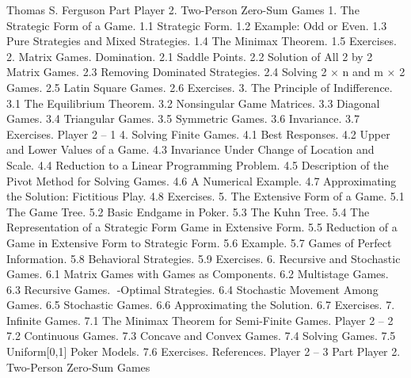 Thomas S. Ferguson
Part Player 2. Two-Person Zero-Sum Games
1. The Strategic Form of a Game.
1.1 Strategic Form.
1.2 Example: Odd or Even.
1.3 Pure Strategies and Mixed Strategies.
1.4 The Minimax Theorem.
1.5 Exercises.
2. Matrix Games. Domination.
2.1 Saddle Points.
2.2 Solution of All 2 by 2 Matrix Games.
2.3 Removing Dominated Strategies.
2.4 Solving 2 × n and m × 2 Games.
2.5 Latin Square Games.
2.6 Exercises.
3. The Principle of Indifference.
3.1 The Equilibrium Theorem.
3.2 Nonsingular Game Matrices.
3.3 Diagonal Games.
3.4 Triangular Games.
3.5 Symmetric Games.
3.6 Invariance.
3.7 Exercises.
Player 2 – 1
4. Solving Finite Games.
4.1 Best Responses.
4.2 Upper and Lower Values of a Game.
4.3 Invariance Under Change of Location and Scale.
4.4 Reduction to a Linear Programming Problem.
4.5 Description of the Pivot Method for Solving Games.
4.6 A Numerical Example.
4.7 Approximating the Solution: Fictitious Play.
4.8 Exercises.
5. The Extensive Form of a Game.
5.1 The Game Tree.
5.2 Basic Endgame in Poker.
5.3 The Kuhn Tree.
5.4 The Representation of a Strategic Form Game in Extensive Form.
5.5 Reduction of a Game in Extensive Form to Strategic Form.
5.6 Example.
5.7 Games of Perfect Information.
5.8 Behavioral Strategies.
5.9 Exercises.
6. Recursive and Stochastic Games.
6.1 Matrix Games with Games as Components.
6.2 Multistage Games.
6.3 Recursive Games. -Optimal Strategies.
6.4 Stochastic Movement Among Games.
6.5 Stochastic Games.
6.6 Approximating the Solution.
6.7 Exercises.
7. Infinite Games.
7.1 The Minimax Theorem for Semi-Finite Games.
Player 2 – 2
7.2 Continuous Games.
7.3 Concave and Convex Games.
7.4 Solving Games.
7.5 Uniform[0,1] Poker Models.
7.6 Exercises.
References.
Player 2 – 3
Part Player 2. Two-Person Zero-Sum Games

